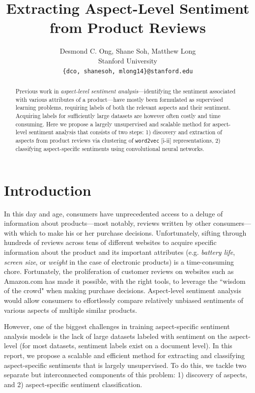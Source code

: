 \documentclass{article} %
\title{  Extracting Aspect-Level Sentiment from Product Reviews  }
\author{
Desmond C. Ong, Shane Soh, Matthew Long \\
Stanford University \\
\texttt{\{dco, shanesoh, mlong14\}@stanford.edu}
}
\begin{document}
\maketitle

\begin{abstract}
Previous work in \textit{aspect-level sentiment analysis}---identifying the sentiment associated with various attributes of a product---have mostly been formulated as supervised learning problems, requiring labels of both the relevant aspects and their sentiment. Acquiring labels for sufficiently large datasets are however often costly and time consuming. Here we propose a largely unsupervised and scalable method for aspect-level sentiment analysis that consists of two steps: 1) discovery and extraction of aspects from product reviews via clustering of \texttt{word2vec} [i-ii] representations, 2) classifying aspect-specific sentiments using convolutional neural networks.
\end{abstract}

\section{Introduction}


In this day and age, consumers have unprecedented access to a deluge of information about products---most notably, reviews written by other consumers---with which to make his or her purchase decisions. Unfortunately, sifting through hundreds of reviews across tens of different websites to acquire specific information about the product and its important attributes (e.g. \textit{battery life}, \textit{screen size}, or \textit{weight} in the case of electronic products) is a time-consuming chore. Fortunately, the proliferation of customer reviews on websites such as Amazon.com has made it possible, with the right tools, to leverage the ``wisdom of the crowd" when making purchase decisions. Aspect-level sentiment analysis would allow consumers to effortlessly compare relatively unbiased sentiments of various aspects of multiple similar products.

However, one of the biggest challenges in training aspect-specific sentiment analysis models is the lack of large datasets labeled with sentiment on the aspect-level (for most datasets, sentiment labels exist on a document level). In this report, we propose a scalable and efficient method for extracting and classifying aspect-specific sentiments that is largely unsupervised. To do this, we tackle two separate but interconnected components of this problem: 1) discovery of aspects, and 2) aspect-specific sentiment classification.
\end{document}
